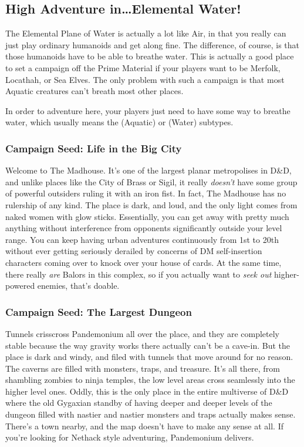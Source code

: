 \subsection{High Adventure in\ldots Elemental Water!}

The Elemental Plane of Water is actually a lot like Air, in that you really can just play ordinary humanoids and get along fine. The difference, of course, is that those humanoids have to be able to breathe water. This is actually a good place to set a campaign off the Prime Material if your players want to be Merfolk, Locathah, or Sea Elves. The only problem with such a campaign is that most Aquatic creatures can't breath most other places.

In order to adventure here, your players just need to have some way to breathe water, which usually means the (Aquatic) or (Water) subtypes.

\subsubsection{Campaign Seed: Life in the Big City}

Welcome to The Madhouse. It's one of the largest planar metropolises in D\&D, and unlike places like the City of Brass or Sigil, it really \textit{doesn't} have some group of powerful outsiders ruling it with an iron fist. In fact, The Madhouse has no rulership of any kind. The place is dark, and loud, and the only light comes from naked women with glow sticks. Essentially, you can get away with pretty much anything without interference from opponents significantly outside your level range. You can keep having urban adventures continuously from 1st to 20th without ever getting seriously derailed by concerns of DM self-insertion characters coming over to knock over your house of cards. At the same time, there really \textit{are} Balors in this complex, so if you actually want to \textit{seek out} higher-powered enemies, that's doable.

\subsubsection{Campaign Seed: The Largest Dungeon}

Tunnels crisscross Pandemonium all over the place, and they are completely stable because the way gravity works there actually can't be a cave-in. But the place is dark and windy, and filed with tunnels that move around for no reason. The caverns are filled with monsters, traps, and treasure. It's all there, from shambling zombies to ninja temples, the low level areas cross seamlessly into the higher level ones. Oddly, this is the only place in the entire multiverse of D\&D where the old Gygaxian standby of having deeper and deeper levels of the dungeon filled with nastier and nastier monsters and traps actually makes sense. There's a town nearby, and the map doesn't have to make any sense at all. If you're looking for Nethack style adventuring, Pandemonium delivers.

